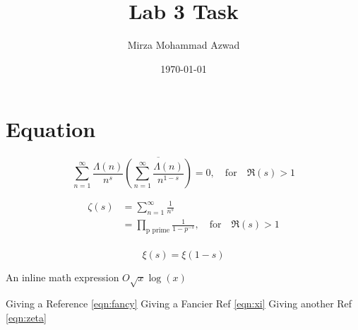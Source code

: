 \documentclass[12pt, a4paper]{article}
\title{Lab 3 Task}
\author{Mirza Mohammad Azwad}
\date{\today} %
\begin{document}

    \section{Equation}

    \begin{equation}
    \label{eqn:fancy}\sum_{n=1}^{\infty}\frac{\Lambda(n)}{n^s}
    \overline{
    \left(
    \sum_{n=1}^{\infty}\frac{\Lambda(n)}{n^{1-s}}
    \right)}=0,
    \quad\text{for}\quad \Re{(s)}>1 
    \end{equation}

    \begin{equation}\label{eqn:zeta}
    \begin{split}
        \zeta(s) &= \sum_{n=1}^{\infty}\frac{1}{n^s} \\
        &= \prod_{\text{p prime}} \frac{1}{1-p^{-s}}, \quad\text{for}\quad \Re{(s)}>1 \\
        \end{split}
    \end{equation}

    \begin{equation}
    \label{eqn:xi}
        \xi(s)=\xi(1-s)
    \end{equation}

    An inline math expression $O\sqrt{x}\log(x)$


    Giving a Reference \ref{eqn:fancy}
    Giving a Fancier Ref \autoref{eqn:xi}
    Giving another Ref \ref{eqn:zeta}
\end{document}
